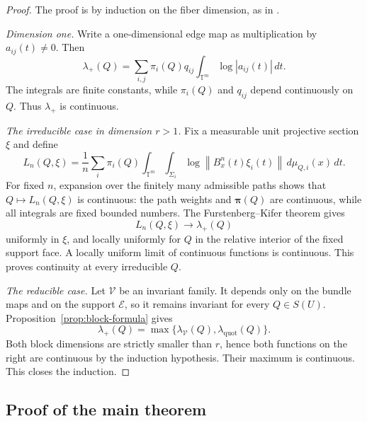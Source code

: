 \documentclass[11pt,a4paper]{amsart}
\newcommand{\T}{\mathbb T}
\newcommand{\cE}{\mathcal E}
\newcommand{\norm}[1]{\left\lVert #1\right\rVert}
\begin{document}
\begin{proof}
The proof is by induction on the fiber dimension, as in
\cite[Proposition~4]{BST}.

\smallskip
\noindent\emph{Dimension one.}
Write a one-dimensional edge map as multiplication by
\(a_{ij}(t)\ne0\).  Then
\[
 \lambda_+(Q)
 =
 \sum_{i,j}\pi_i(Q)q_{ij}
 \int_{\T^m}\log|a_{ij}(t)|\,dt.
\]
The integrals are finite constants, while
\(\pi_i(Q)\) and \(q_{ij}\) depend continuously on \(Q\).  Thus
\(\lambda_+\) is continuous.

\smallskip
\noindent\emph{The irreducible case in dimension \(r>1\).}
Fix a measurable unit projective section \(\xi\) and define
\[
 L_n(Q,\xi)
 =
 \frac1n\sum_i\pi_i(Q)
 \int_{\T^m}\int_{\Sigma_i}
 \log\norm{B_x^n(t)\xi_i(t)}
 \,d\mu_{Q,i}(x)\,dt.
\]
For fixed \(n\), expansion over the finitely many admissible paths
shows that \(Q\mapsto L_n(Q,\xi)\) is continuous: the path weights and
\(\boldsymbol\pi(Q)\) are continuous, while all integrals are fixed
bounded numbers.  The Furstenberg--Kifer theorem gives
\[
 L_n(Q,\xi)\longrightarrow\lambda_+(Q)
\]
uniformly in \(\xi\), and locally uniformly for \(Q\) in the relative
interior of the fixed support face.  A locally uniform limit of
continuous functions is continuous.  This proves continuity at every
irreducible \(Q\).

\smallskip
\noindent\emph{The reducible case.}
Let \(\boldsymbol{\mathcal V}\) be an invariant family.  It depends
only on the bundle maps and on the support \(\cE\), so it remains
invariant for every \(Q\in S(U)\).  Proposition~\ref{prop:block-formula}
gives
\[
 \lambda_+(Q)
 =
 \max\{\lambda_{\mathcal V}(Q),
        \lambda_{\mathrm{quot}}(Q)\}.
\]
Both block dimensions are strictly smaller than \(r\), hence both
functions on the right are continuous by the induction hypothesis.
Their maximum is continuous.  This closes the induction.
\end{proof}

\subsection{Proof of the main theorem}
\end{document}
